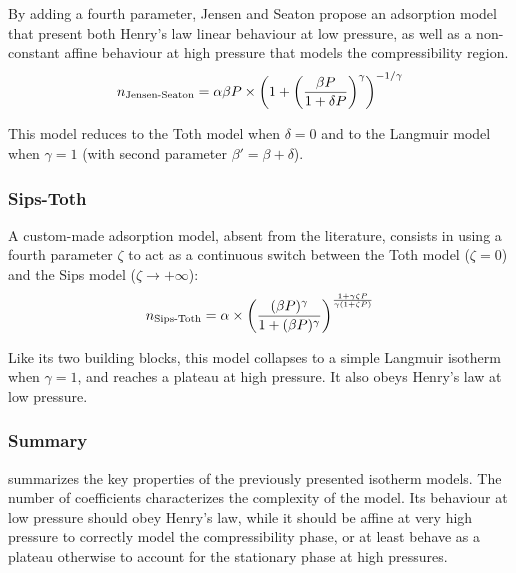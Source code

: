\documentclass[main.tex]{subfiles}
\begin{document}
By adding a fourth parameter, Jensen and Seaton %
propose an adsorption model that present both Henry's law linear behaviour at low pressure, as well as a non-constant affine behaviour at high pressure that models the compressibility region.
\[n_\text{Jensen-Seaton} = \alpha\beta P\times\left(1 + \left(\frac{\beta P}{1 + \delta P}\right)^\gamma\right)^{-1/\gamma}\]

This model reduces to the Toth model when $\delta = 0$ and to the Langmuir model when $\gamma = 1$ (with second parameter $\beta' = \beta+\delta$).%

\subsubsection{Sips-Toth}

A custom-made adsorption model, absent from the literature, consists in using a fourth parameter $\zeta$ to act as a continuous switch between the Toth model ($\zeta = 0$) and the Sips model ($\zeta \to +\infty$):
\[n_\text{Sips-Toth} = \alpha\times\left(\frac{(\beta P)^\gamma}{1 + (\beta P)^\gamma}\right)^{\frac{1 + \gamma\zeta P}{\gamma(1 + \zeta P)}}\]

Like its two building blocks, this model collapses to a simple Langmuir isotherm when $\gamma = 1$, and reaches a plateau at high pressure. It also obeys Henry's law at low pressure.

\subsubsection{Summary}

 summarizes the key properties of the previously presented isotherm models. The number of coefficients characterizes the complexity of the model. Its behaviour at low pressure should obey Henry's law, while it should be affine at very high pressure to correctly model the compressibility phase, or at least behave as a plateau otherwise to account for the stationary phase at high pressures.
\end{document}
